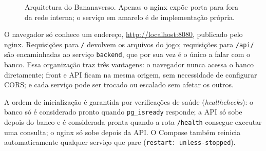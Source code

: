 \documentclass[12pt]{article}
\begin{document}
\begin{figure}[ht]
\centering
{}
\caption{Arquitetura do Bananaverso. Apenas o nginx expõe porta para fora
da rede interna; o serviço em amarelo é de implementação própria.}
\label{fig:arquitetura}
\end{figure}

O navegador só conhece um endereço, \url{http://localhost:8080}, publicado
pelo nginx. Requisições para \texttt{/} devolvem os arquivos do jogo;
requisições para \texttt{/api/} são encaminhadas ao serviço
\texttt{backend}, que por sua vez é o único a falar com o banco. Essa
organização traz três vantagens: o navegador nunca acessa o banco
diretamente; front e API ficam na mesma origem, sem necessidade de
configurar CORS; e cada serviço pode ser trocado ou escalado sem afetar os
outros.

A ordem de inicialização é garantida por verificações de saúde
(\emph{healthchecks}): o banco só é considerado pronto quando
\texttt{pg\_isready} responde; a API só sobe depois do banco e é
considerada pronta quando a rota \texttt{/health} consegue executar uma
consulta; o nginx só sobe depois da API. O Compose também reinicia
automaticamente qualquer serviço que pare (\texttt{restart:
unless-stopped}).
\end{document}
